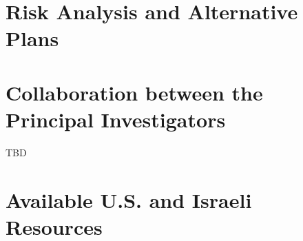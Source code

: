 \documentclass[12pt]{article}
\begin{document}
\section{Risk Analysis and Alternative Plans}


\section{Collaboration between the Principal Investigators}
TBD

\section{Available U.S. and Israeli Resources}






\pagebreak


\end{document}
